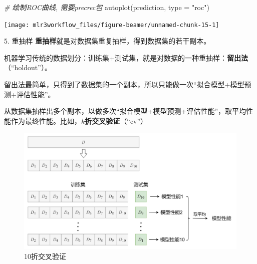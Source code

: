 \documentclass[
  11pt,
  ignorenonframetext,
  dvipsnames,UTF8]{beamer}
\newenvironment{Shaded}{\begin{snugshade}}{\end{snugshade}}
\newcommand{\AttributeTok}[1]{\textcolor[rgb]{0.77,0.63,0.00}{#1}}
\newcommand{\CommentTok}[1]{\textcolor[rgb]{0.56,0.35,0.01}{\textit{#1}}}
\newcommand{\FunctionTok}[1]{\textcolor[rgb]{0.00,0.00,0.00}{#1}}
\newcommand{\NormalTok}[1]{#1}
\newcommand{\StringTok}[1]{\textcolor[rgb]{0.31,0.60,0.02}{#1}}
\begin{document}
\begin{frame}[fragile]{}
\protect\hypertarget{section-7}{}
\begin{Shaded}
\begin{Highlighting}[]
\CommentTok{\# 绘制ROC曲线, 需要precrec包}
\FunctionTok{autoplot}\NormalTok{(prediction, }\AttributeTok{type =} \StringTok{"roc"}\NormalTok{)     }
\end{Highlighting}
\end{Shaded}

\begin{center}\texttt{[image: mlr3workflow\_files/figure-beamer/unnamed-chunk-15-1]} \end{center}
\end{frame}

\begin{frame}{5. 重抽样}
\protect\hypertarget{ux91cdux62bdux6837}{}
\textbf{重抽样}就是对数据集重复抽样，得到数据集的若干副本。

机器学习传统的数据划分：训练集+测试集，就是对数据的一种重抽样：\textbf{留出法}（``holdout''）。

留出法最简单，只得到了数据集的一个副本，所以只能做一次``拟合模型+模型预测+评估性能''。

从数据集抽样出多个副本，以做多次``拟合模型+模型预测+评估性能''，取平均性能作为最终性能。比如，\textbf{\(k\)折交叉验证}（``cv''）
\end{frame}

\begin{frame}{}
\protect\hypertarget{section-8}{}
\begin{figure}

{\centering \includegraphics[width=0.9\linewidth]{images/k_folds} 

}

\caption{10折交叉验证}\label{fig:unnamed-chunk-16}
\end{figure}
\end{frame}
\end{document}

